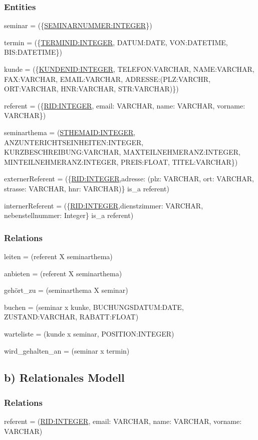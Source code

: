 \documentclass[10pt,a4paper]{report}
\begin{document}
\newpage

\subsubsection{Entities}
seminar = (\{\underline{SEMINARNUMMER:INTEGER}\})

termin  = (\{\underline{TERMINID:INTEGER}, DATUM:DATE, VON:DATETIME, BIS:DATETIME\})

kunde   = (\{\underline{KUNDENID:INTEGER}, TELEFON:VARCHAR, NAME:VARCHAR, FAX:VARCHAR, EMAIL:VARCHAR, ADRESSE:(PLZ:VARCHR, ORT:VARCHAR, HNR:VARCHAR, STR:VARCHAR)\})

referent = (\{\underline{RID:INTEGER}, email: VARCHAR, name: VARCHAR, vorname: VARCHAR\})

seminarthema = (\underline{STHEMAID:INTEGER}, ANZUNTERICHTSEINHEITEN:INTEGER, KURZBESCHREIBUNG:VARCHAR, MAXTEILNEHMERANZ:INTEGER, MINTEILNEHMERANZ:INTEGER, PREIS:FLOAT, TITEL:VARCHAR\})

externerReferent = (\{\underline{RID:INTEGER},adresse: (plz: VARCHAR, ort: VARCHAR, strasse: VARCHAR, hnr: VARCHAR)\} is\_a referent)

internerReferent = (\{\underline{RID:INTEGER},dienstzimmer: VARCHAR, nebenstellnummer: Integer\} is\_a referent)

\subsubsection{Relations}

leiten = (referent X seminarthema)

anbieten = (referent X seminarthema)

gehört\_zu = (seminarthema X seminar)

buchen = (seminar x kunke, BUCHUNGSDATUM:DATE, ZUSTAND:VARCHAR, RABATT:FLOAT)

warteliste = (kunde x seminar, POSITION:INTEGER)

wird\_gehalten\_an = (seminar x termin)


\subsection{b) Relationales Modell}
\subsubsection{Relations}
referent = (\underline{RID:INTEGER}, email: VARCHAR, name: VARCHAR, vorname: VARCHAR)
\end{document}

